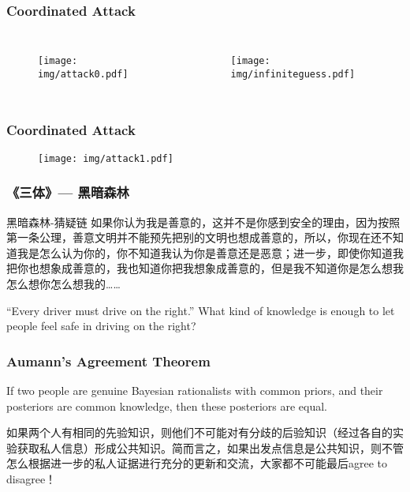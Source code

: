 \documentclass[UTF8,11pt,colorlinks,compress,openany]{beamer}%
\begin{document}
\begin{frame}\frametitle{Coordinated Attack}
\vspace*{-3ex}
	\begin{columns}
		\begin{figure}[H]
			\colorbox{green!15}{\texttt{[image: img/attack0.pdf]}}
		\end{figure}
		\begin{figure}[H]
			\colorbox{green!15}{\texttt{[image: img/infiniteguess.pdf]}}
		\end{figure}
	\end{columns}
\end{frame}

\begin{frame}\frametitle{Coordinated Attack}
	\begin{figure}[H]
		\texttt{[image: img/attack1.pdf]}
	\end{figure}
\end{frame}

\begin{frame}\frametitle{《三体》--- 黑暗森林}
\begin{block}{黑暗森林-猜疑链}
如果你认为我是善意的，这并不是你感到安全的理由，因为按照第一条公理，善意文明并不能预先把别的文明也想成善意的，所以，你现在还不知道我是怎么认为你的，你不知道我认为你是善意还是恶意；进一步，即使你知道我把你也想象成善意的，我也知道你把我想象成善意的，但是我不知道你是怎么想我怎么想你怎么想我的……
\end{block}
\begin{block}{``Every driver must drive on the right.''}
What kind of knowledge is enough to let people feel safe in driving on the right?
\end{block}
\end{frame}

\begin{frame}\frametitle{Aumann's Agreement Theorem}
\begin{theorem}
If two people are genuine Bayesian rationalists with common priors, and their posteriors are common knowledge, then these posteriors are equal.
\end{theorem}
如果两个人有相同的先验知识，则他们不可能对有分歧的后验知识（经过各自的实验获取私人信息）形成公共知识。简而言之，如果出发点信息是公共知识，则不管怎么根据进一步的私人证据进行充分的更新和交流，大家都不可能最后agree to disagree！
\end{frame}
\end{document}

